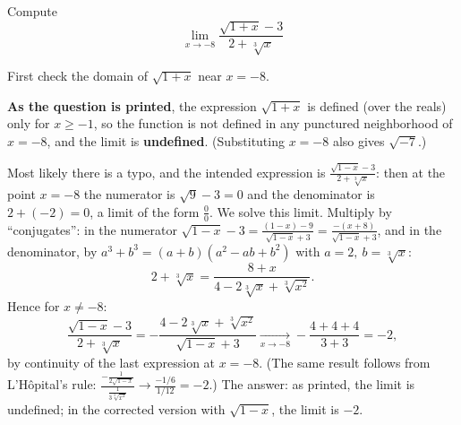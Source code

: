 
\begin{question}
Compute
\[ \lim_{x\longrightarrow-8}\frac{\sqrt{1+x}-3}{2+\sqrt[3]{x}} \]
\end{question}

\begin{hint}
First check the domain of $\sqrt{1+x}$ near $x=-8$.
\end{hint}

\begin{solution}
\textbf{As the question is printed}, the expression $\sqrt{1+x}$ is defined (over the reals) only for $x\ge-1$, so the function is not defined in any punctured neighborhood of $x=-8$, and the limit is \textbf{undefined}. (Substituting $x=-8$ also gives $\sqrt{-7}$.)

Most likely there is a typo, and the intended expression is $\frac{\sqrt{1-x}-3}{2+\sqrt[3]{x}}$: then at the point $x=-8$ the numerator is $\sqrt9-3=0$ and the denominator is $2+(-2)=0$, a limit of the form $\frac00$. We solve this limit. Multiply by ``conjugates'': in the numerator $\sqrt{1-x}-3=\frac{(1-x)-9}{\sqrt{1-x}+3}=\frac{-(x+8)}{\sqrt{1-x}+3}$, and in the denominator, by $a^3+b^3=(a+b)(a^2-ab+b^2)$ with $a=2,\ b=\sqrt[3]x$:
\[ 2+\sqrt[3]{x}=\frac{8+x}{4-2\sqrt[3]{x}+\sqrt[3]{x^2}}. \]
Hence for $x\neq-8$:
\[ \frac{\sqrt{1-x}-3}{2+\sqrt[3]{x}}=-\frac{4-2\sqrt[3]{x}+\sqrt[3]{x^2}}{\sqrt{1-x}+3}\xrightarrow[x\to-8]{}-\frac{4+4+4}{3+3}=-2, \]
by continuity of the last expression at $x=-8$. (The same result follows from L'Hôpital's rule: $\frac{-\frac{1}{2\sqrt{1-x}}}{\frac{1}{3\sqrt[3]{x^2}}}\to\frac{-1/6}{1/12}=-2$.)
The answer: as printed, the limit is undefined; in the corrected version with $\sqrt{1-x}$, the limit is $\boxed{-2}$.
\end{solution}
